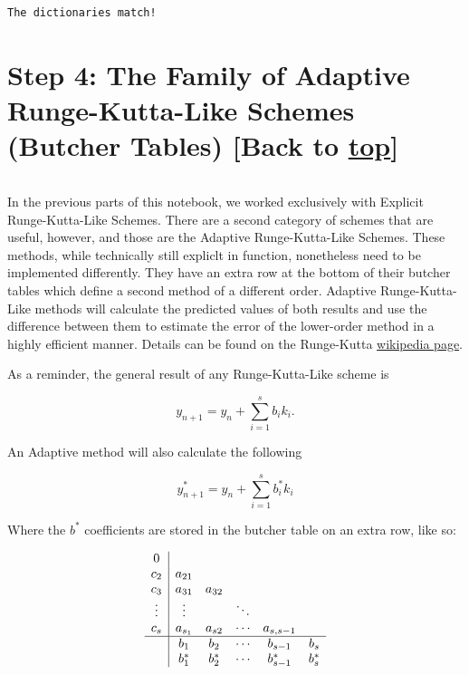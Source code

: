 \documentclass[landscape,letterpaper,10pt,english]{article}
\begin{document}
    \begin{Verbatim}[commandchars=\\\{\}]
The dictionaries match!
    \end{Verbatim}

    \hypertarget{step-4-the-family-of-adaptive-runge-kutta-like-schemes-butcher-tables-back-to-top}{%
\section{\texorpdfstring{Step 4: The Family of Adaptive Runge-Kutta-Like
Schemes (Butcher Tables) {[}Back to
\hyperref[toc]{top}{]}}{Step 4: The Family of Adaptive Runge-Kutta-Like Schemes (Butcher Tables) {[}Back to {]}}}\label{step-4-the-family-of-adaptive-runge-kutta-like-schemes-butcher-tables-back-to-top}}

\[\label{introbutchera}\]

In the previous parts of this notebook, we worked exclusively with
Explicit Runge-Kutta-Like Schemes. There are a second category of
schemes that are useful, however, and those are the Adaptive
Runge-Kutta-Like Schemes. These methods, while technically still
expliclt in function, nonetheless need to be implemented differently.
They have an extra row at the bottom of their butcher tables which
define a second method of a different order. Adaptive Runge-Kutta-Like
methods will calculate the predicted values of both results and use the
difference between them to estimate the error of the lower-order method
in a highly efficient manner. Details can be found on the Runge-Kutta
\href{https://en.wikipedia.org/wiki/Runge\%E2\%80\%93Kutta_methods\#Adaptive_Runge\%E2\%80\%93Kutta_methods}{wikipedia
page}.

As a reminder, the general result of any Runge-Kutta-Like scheme is

\[y_{n+1} = y_n + \sum_{i=1}^s b_ik_i. \]

An Adaptive method will also calculate the following

\[y^*_{n+1} = y_n + \sum_{i=1}^s b^*_ik_i \]

Where the \(b^*\) coefficients are stored in the butcher table on an
extra row, like so:

\[\begin{array}{c|ccccc}
    0 & \\
    c_2 & a_{21} & \\
    c_3 & a_{31} & a_{32} & \\
    \vdots & \vdots &  & \ddots \\
    c_s & a_{s_1} & a_{s2} & \cdots & a_{s,s-1} \\ \hline 
     & b_1 & b_2 & \cdots & b_{s-1} & b_s \\
     & b^*_1 & b^*_2 & \cdots & b^*_{s-1} & b^*_s \\
\end{array} \]
\end{document}
